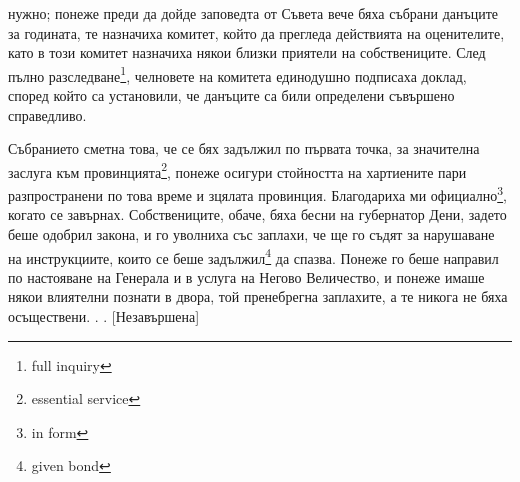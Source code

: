 \documentclass[12pt]{book}
\begin{document}
нужно; понеже преди да дойде заповедта от Съвета вече бяха събрани данъците за годината, те назначиха комитет, който да прегледа действията на оценителите, като в този комитет назначиха някои близки приятели на собствениците. След пълно разследване\footnote{full inquiry}, челновете на комитета единодушно подписаха доклад, според който са установили, че данъците са били определени съвършено справедливо. 

Събранието сметна това, че се бях задължил по първата точка, за значителна заслуга към провинцията\footnote{essential service}, понеже осигури стойността на хартиените пари разпространени по това време и зцялата провинция. Благодариха ми официално\footnote{in form}, когато се завърнах. Собствениците, обаче, бяха бесни на губернатор Дени, задето беше одобрил закона, и го уволниха със заплахи, че ще го съдят за нарушаване на инструкциите, които се беше задължил\footnote{given bond} да спазва. Понеже го беше направил по настояване на Генерала и в услуга на Негово Величество, и понеже имаше някои влиятелни познати в двора, той пренебрегна заплахите, а те никога не бяха осъществени. . . [Незавършена]
\end{document}
